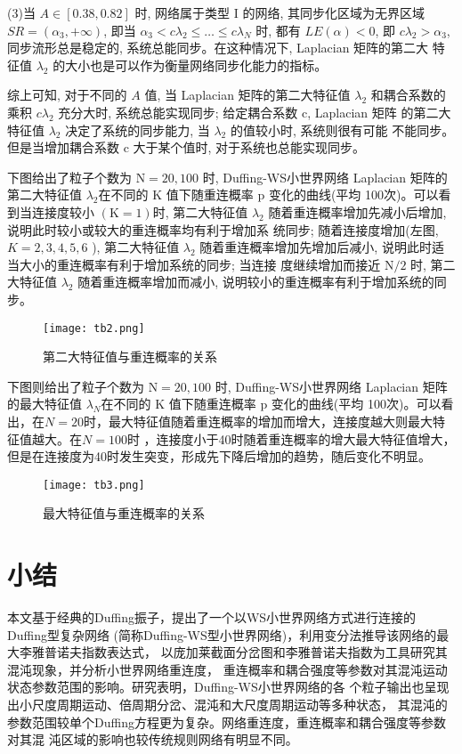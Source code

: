 (3)当 $A \in[0.38,0.82]$ 时, 网络属于类型 $\mathrm{I}$ 的网络, 其同步化区域为无界区域 $S R=\left(\alpha_3,+\infty\right)$,
即当 $\alpha_3<c \lambda_2 \leq \ldots \leq c \lambda_N$ 时, 都有 $L E(\alpha)<0$, 即 $c \lambda_2>\alpha_3$,
同步流形总是稳定的, 系统总能同步。在这种情况下, Laplacian 矩阵的第二大 特征值 $\lambda_2$ 的大小也是可以作为衡量网络同步化能力的指标。\par

综上可知, 对于不同的 $A$ 值, 当 Laplacian 矩阵的第二大特征值 $\lambda_2$ 和耦合系数的乘积 $c \lambda_2$ 充分大时,
系统总能实现同步; 给定耦合系数 $\mathrm{c}$, Laplacian 矩阵 的第二大特征值 $\lambda_2$ 决定了系统的同步能力,
当 $\lambda_2$ 的值较小时, 系统则很有可能 不能同步。但是当增加耦合系数 $\mathrm{c}$ 大于某个值时, 对于系统也总能实现同步。

下图给出了粒子个数为 $\mathrm{N}=20,100$ 时, Duffing-WS小世界网络 Laplacian 矩阵的第二大特征值 $\lambda_2$在不同的 $\mathrm{K}$ 值下随重连概率 $\mathrm{p}$
变化的曲线(平均 100次)。可以看到当连接度较小 $(\mathrm{K}=1)$时, 第二大特征值 $\lambda_2$ 随着重连概率增加先减小后增加,
说明此时较小或较大的重连概率均有利于增加系 统同步; 随着连接度增加(左图, $K=2,3,4,5,6$ ), 第二大特征值 $\lambda_2$
随着重连概率增加先增加后减小, 说明此时适当大小的重连概率有利于增加系统的同步; 当连接 度继续增加而接近 $\mathrm{N} / 2$ 时,
第二大特征值 $\lambda_2$ 随着重连概率增加而减小, 说明较小的重连概率有利于增加系统的同步。\par
\begin{figure}[!htbp]
    \centering
    \texttt{[image: tb2.png]}
    \caption{第二大特征值与重连概率的关系}
\end{figure}
下图则给出了粒子个数为 $\mathrm{N}=20,100$ 时, Duffing-WS小世界网络 Laplacian 矩阵的最大特征值 $\lambda_N$在不同的 $\mathrm{K}$ 值下随重连概率 $\mathrm{p}$
变化的曲线(平均 100次)。可以看出，在$N=20$时，最大特征值随着重连概率的增加而增大，连接度越大则最大特征值越大。在$N=100$时
，连接度小于40时随着重连概率的增大最大特征值增大，但是在连接度为40时发生突变，形成先下降后增加的趋势，随后变化不明显。
\begin{figure}[!htbp]
    \centering
    \texttt{[image: tb3.png]}
    \caption{最大特征值与重连概率的关系}
\end{figure}
\section{小结} 
本文基于经典的Duffing振子，提出了一个以WS小世界网络方式进行连接的Duffing型复杂网络
(简称Duffing-WS型小世界网络)，利用变分法推导该网络的最大李雅普诺夫指数表达式，
以庞加莱截面分岔图和李雅普诺夫指数为工具研究其混沌现象，并分析小世界网络重连度，
重连概率和耦合强度等参数对其混沌运动状态参数范围的影响。研究表明，Duffing-WS小世界网络的各
个粒子输出也呈现出小尺度周期运动、倍周期分岔、混沌和大尺度周期运动等多种状态，
其混沌的参数范围较单个Duffing方程更为复杂。网络重连度，重连概率和耦合强度等参数对其混
沌区域的影响也较传统规则网络有明显不同。